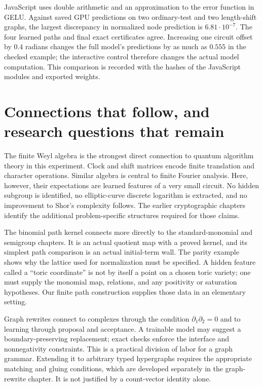 JavaScript uses double arithmetic and an approximation to the error
function in GELU. Against saved GPU predictions on two ordinary-test and
two length-shift graphs, the largest discrepancy in normalized node
prediction is $6.81\cdot10^{-7}$. The four learned paths and final exact
certificates agree. Increasing one circuit offset by $0.4$ radians changes
the full model's predictions by as much as $0.555$ in the checked example;
the interactive control therefore changes the actual model computation.
This comparison is recorded with the hashes of the JavaScript modules
and exported weights.\cite{qtExperiment}

\section{Connections that follow, and research questions that remain}

The finite Weyl algebra is the strongest direct connection to quantum
algorithm theory in this experiment. Clock and shift matrices encode
finite translation and character operations. Similar algebra is central
to finite Fourier analysis. Here, however, their expectations are learned
features of a very small circuit. No hidden subgroup is identified, no
elliptic-curve discrete logarithm is extracted, and no improvement to
Shor's complexity follows. The earlier cryptographic chapters identify
the additional problem-specific structures required for those claims.

The binomial path kernel connects more directly to the standard-monomial
and semigroup chapters. It is an actual quotient map with a proved kernel,
and its simplest path comparison is an actual initial-term wall. The
parity example shows why the lattice used for normalization must be
specified. A hidden feature called a ``toric coordinate'' is not by
itself a point on a chosen toric variety; one must supply the monomial
map, relations, and any positivity or saturation hypotheses. Our finite
path construction supplies those data in an elementary setting.

Graph rewrites connect to complexes through the condition
$\partial_1\partial_2=0$ and to learning through proposal and acceptance.
A trainable model may suggest a boundary-preserving replacement; exact
checks enforce the interface and nonnegativity constraints. This is a
practical division of labor for a graph grammar. Extending it to arbitrary
typed hypergraphs requires the appropriate matching and gluing conditions,
which are developed separately in the graph-rewrite chapter. It is not
justified by a count-vector identity alone.

